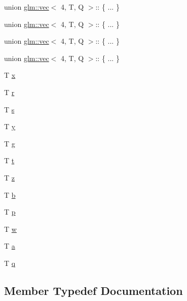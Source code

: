 \begin{DoxyCompactItemize}
\item 
union \mbox{\hyperlink{structglm_1_1vec}{glm\+::vec}}$<$ 4, T, Q $>$\+:: \{ ... \}  
\item 
union \mbox{\hyperlink{structglm_1_1vec}{glm\+::vec}}$<$ 4, T, Q $>$\+:: \{ ... \}  
\item 
union \mbox{\hyperlink{structglm_1_1vec}{glm\+::vec}}$<$ 4, T, Q $>$\+:: \{ ... \}  
\item 
union \mbox{\hyperlink{structglm_1_1vec}{glm\+::vec}}$<$ 4, T, Q $>$\+:: \{ ... \}  
\item 
T \mbox{\hyperlink{structglm_1_1vec_3_014_00_01_t_00_01_q_01_4_a4f0ee6c1ad138fad04c3918cba14d108}{x}}
\item 
T \mbox{\hyperlink{structglm_1_1vec_3_014_00_01_t_00_01_q_01_4_a2b985b974ca60ce93681865d0251adbd}{r}}
\item 
T \mbox{\hyperlink{structglm_1_1vec_3_014_00_01_t_00_01_q_01_4_af72c3f5a2b95f3b81b0b3a751b260fe7}{s}}
\item 
T \mbox{\hyperlink{structglm_1_1vec_3_014_00_01_t_00_01_q_01_4_a819e3f804a8e92a03b37abe5fa6f4df1}{y}}
\item 
T \mbox{\hyperlink{structglm_1_1vec_3_014_00_01_t_00_01_q_01_4_a74ae0e201ec1b0c9090d238deb1137aa}{g}}
\item 
T \mbox{\hyperlink{structglm_1_1vec_3_014_00_01_t_00_01_q_01_4_ab022af720f5053ff65c7ea8688289ce1}{t}}
\item 
T \mbox{\hyperlink{structglm_1_1vec_3_014_00_01_t_00_01_q_01_4_aef4c0898d2f91614ba5a747b8445a9d6}{z}}
\item 
T \mbox{\hyperlink{structglm_1_1vec_3_014_00_01_t_00_01_q_01_4_a632d331fa4a8414d4bb81df66bc722cb}{b}}
\item 
T \mbox{\hyperlink{structglm_1_1vec_3_014_00_01_t_00_01_q_01_4_a026c2fbd55de199bf5888b63c7eea3d2}{p}}
\item 
T \mbox{\hyperlink{structglm_1_1vec_3_014_00_01_t_00_01_q_01_4_a72b956e1e8cce70057f78520dd4e1c90}{w}}
\item 
T \mbox{\hyperlink{structglm_1_1vec_3_014_00_01_t_00_01_q_01_4_a2c591708237bac7d2047ff5af383a012}{a}}
\item 
T \mbox{\hyperlink{structglm_1_1vec_3_014_00_01_t_00_01_q_01_4_a206e0f1edc2115cde3a7d31c131982ae}{q}}
\end{DoxyCompactItemize}


\subsection{Member Typedef Documentation}
\mbox{\label{structglm_1_1vec_3_014_00_01_t_00_01_q_01_4_a175b3fdeb819aab912118ac1605b675b}} 

